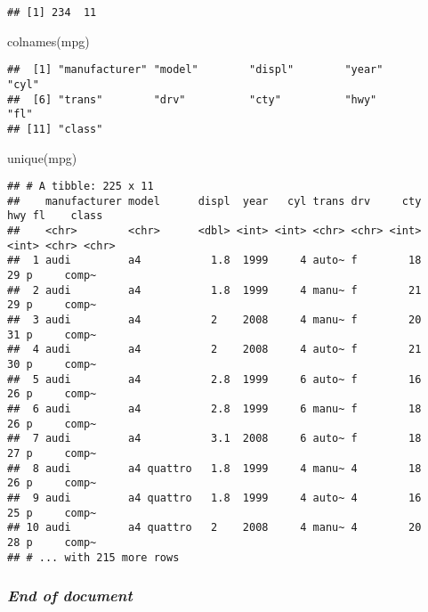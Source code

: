 \documentclass[
]{article}
\newenvironment{Shaded}{\begin{snugshade}}{\end{snugshade}}
\newcommand{\FunctionTok}[1]{\textcolor[rgb]{0.00,0.00,0.00}{#1}}
\newcommand{\NormalTok}[1]{#1}
\begin{document}
\begin{verbatim}
## [1] 234  11
\end{verbatim}

\begin{Shaded}
\begin{Highlighting}[]
\FunctionTok{colnames}\NormalTok{(mpg)}
\end{Highlighting}
\end{Shaded}

\begin{verbatim}
##  [1] "manufacturer" "model"        "displ"        "year"         "cyl"         
##  [6] "trans"        "drv"          "cty"          "hwy"          "fl"          
## [11] "class"
\end{verbatim}

\begin{Shaded}
\begin{Highlighting}[]
\FunctionTok{unique}\NormalTok{(mpg)}
\end{Highlighting}
\end{Shaded}

\begin{verbatim}
## # A tibble: 225 x 11
##    manufacturer model      displ  year   cyl trans drv     cty   hwy fl    class
##    <chr>        <chr>      <dbl> <int> <int> <chr> <chr> <int> <int> <chr> <chr>
##  1 audi         a4           1.8  1999     4 auto~ f        18    29 p     comp~
##  2 audi         a4           1.8  1999     4 manu~ f        21    29 p     comp~
##  3 audi         a4           2    2008     4 manu~ f        20    31 p     comp~
##  4 audi         a4           2    2008     4 auto~ f        21    30 p     comp~
##  5 audi         a4           2.8  1999     6 auto~ f        16    26 p     comp~
##  6 audi         a4           2.8  1999     6 manu~ f        18    26 p     comp~
##  7 audi         a4           3.1  2008     6 auto~ f        18    27 p     comp~
##  8 audi         a4 quattro   1.8  1999     4 manu~ 4        18    26 p     comp~
##  9 audi         a4 quattro   1.8  1999     4 auto~ 4        16    25 p     comp~
## 10 audi         a4 quattro   2    2008     4 manu~ 4        20    28 p     comp~
## # ... with 215 more rows
\end{verbatim}

\hypertarget{end-of-document}{%
\subsubsection{\texorpdfstring{\emph{End of
document}}{End of document}}\label{end-of-document}}
\end{document}

